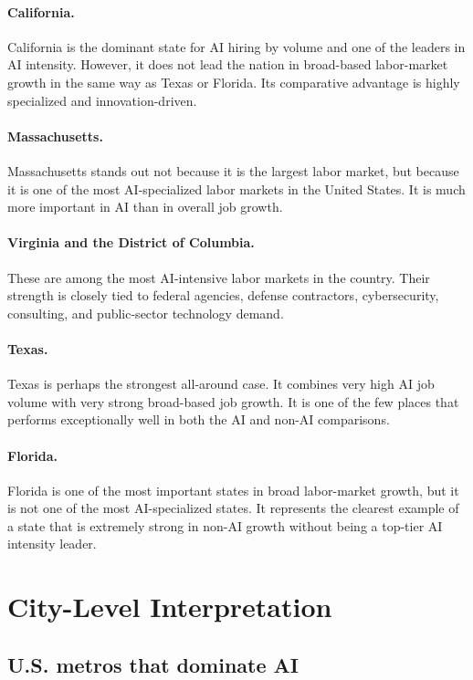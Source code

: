 \documentclass[12pt,a4paper]{article}
\begin{document}
\paragraph{California.}
California is the dominant state for AI hiring by volume and one of the leaders in AI intensity. However, it does not lead the nation in broad-based labor-market growth in the same way as Texas or Florida. Its comparative advantage is highly specialized and innovation-driven.

\paragraph{Massachusetts.}
Massachusetts stands out not because it is the largest labor market, but because it is one of the most AI-specialized labor markets in the United States. It is much more important in AI than in overall job growth.

\paragraph{Virginia and the District of Columbia.}
These are among the most AI-intensive labor markets in the country. Their strength is closely tied to federal agencies, defense contractors, cybersecurity, consulting, and public-sector technology demand.

\paragraph{Texas.}
Texas is perhaps the strongest all-around case. It combines very high AI job volume with very strong broad-based job growth. It is one of the few places that performs exceptionally well in both the AI and non-AI comparisons.

\paragraph{Florida.}
Florida is one of the most important states in broad labor-market growth, but it is not one of the most AI-specialized states. It represents the clearest example of a state that is extremely strong in non-AI growth without being a top-tier AI intensity leader.

\section{City-Level Interpretation}

\subsection{U.S. metros that dominate AI}
\end{document}
